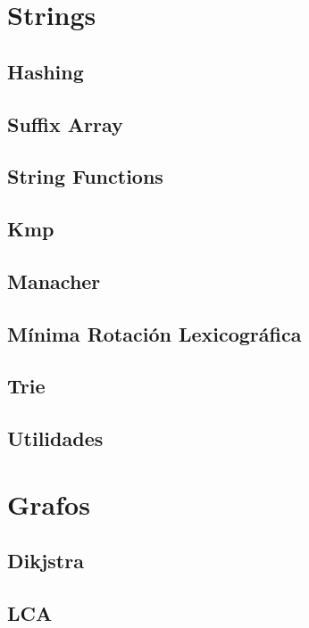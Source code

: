 \documentclass[a4paper,11pt,landscape,twocolumn]{article}
\begin{document}
\section{Strings} %
\subsection{Hashing}

\subsection{Suffix Array}

\subsection{String Functions}

\subsection{Kmp}

\subsection{Manacher}

\subsection{Mínima Rotación Lexicográfica}

\subsection{Trie}

\subsection{Utilidades}


\section{Grafos} %
\subsection{Dikjstra}

\subsection{LCA}

\end{document}
